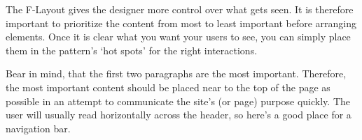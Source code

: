 The F-Layout gives the designer more control over what gets seen.
It is therefore important to prioritize the content from most to least important before arranging elements. Once it is clear what you want your users to see, you can simply place them in the pattern’s ‘hot spots’ for the right interactions.

Bear in mind, that the first two paragraphs are the most important. 
Therefore, the most important content should be placed near to the top of the page as possible in an attempt to communicate the site’s (or page) purpose quickly. The user will usually read horizontally across the header, so here’s a good place for a navigation bar.










